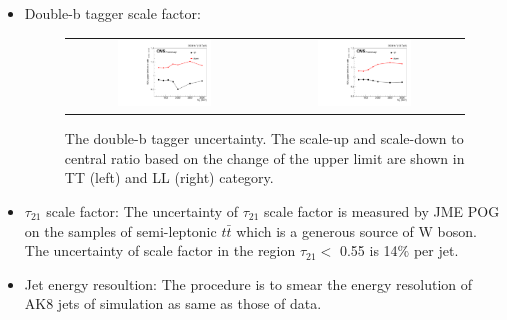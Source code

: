 \begin{itemize}
  \item Double-b tagger scale factor:
  
\begin{figure}[t]
  \centering
 \begin{tabular}{cc}
    \includegraphics[width=0.5\textwidth]{Figures/plots_uncert/btag_TT.pdf} &
   \includegraphics[width=0.5\textwidth]{Figures/plots_uncert/btag_LL.pdf} \\
  \end{tabular}
  \caption{The double-b tagger uncertainty. The scale-up and scale-down to central ratio based on the change of the upper limit are shown in TT (left) and LL (right) category.}
  \label{fig:hvt_brs}
\end{figure}    
  
  \item $\tau _{21}$ scale factor: The uncertainty of $\tau _{21}$ scale factor is measured by JME POG on the samples of semi-leptonic $t\bar{t}$ which is a generous source of W boson. The uncertainty of scale factor in the region $\tau _{21} <$ 0.55 is 14$\% $ per jet.
 
  \item Jet energy resoultion: The procedure is to smear the energy resolution of AK8 jets of simulation as same as those of data.  
  

\end{itemize}
